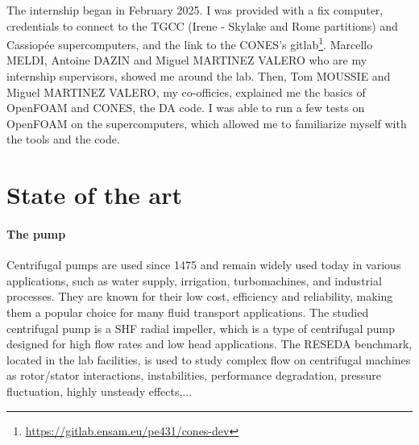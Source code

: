
The internship began in February 2025. I was provided with a fix computer, credentials to connect to the \ac{TGCC} (Irene - Skylake and Rome partitions) and Cassiopée supercomputers, and the link to the \ac{CONES}'s gitlab\footnote{\url{https://gitlab.ensam.eu/pe431/cones-dev}}. Marcello MELDI, Antoine DAZIN and Miguel MARTINEZ VALERO who are my internship supervisors, showed me around the lab.
Then, Tom MOUSSIE and Miguel MARTINEZ VALERO, my co-officies, explained me the basics of \ac{OpenFOAM} and CONES, the DA code. I was able to run a few tests on OpenFOAM on the supercomputers, which allowed me to familiarize myself with the tools and the code.



\newpage
\section{State of the art}
\label{sec:stateOfArt}


\paragraph{The pump} Centrifugal pumps are used since 1475\cite{retiFrancescoDiGiorgio1963} and remain widely used today in various applications, such as water supply, irrigation, turbomachines, and industrial processes. They are known for their low cost, efficiency and reliability, making them a popular choice for many fluid transport applications. The studied centrifugal pump is a \ac{SHF} radial impeller, which is a type of centrifugal pump designed for high flow rates and low head applications. The RESEDA benchmark, located in the lab facilities, is used to study complex flow on centrifugal machines as rotor/stator interactions, instabilities, performance degradation, pressure fluctuation, highly unsteady effects,...\cite{SHAH2013715}

